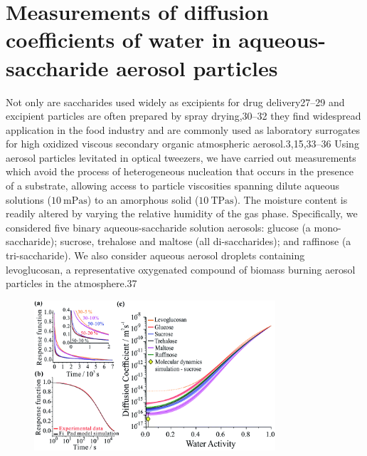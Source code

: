 \section{Measurements of diffusion coefficients of water in aqueous-saccharide aerosol particles}\label{sec:wat_d_coefs}

Not only are saccharides used widely as excipients for drug delivery27–29 and excipient particles are often prepared by spray drying,30–32 they find widespread application in the food industry and are commonly used as laboratory surrogates for high oxidized viscous secondary organic atmospheric aerosol.3,15,33–36 Using aerosol particles levitated in optical tweezers, we have carried out measurements which avoid the process of heterogeneous nucleation that occurs in the presence of a substrate, allowing access to particle viscosities spanning dilute aqueous solutions ($\SI{10}{\milli\pascal\second}$) to an amorphous solid ($\SI{10}{\tera\pascal\second}$). The moisture content is readily altered by varying the relative humidity of the gas phase. Specifically, we considered five binary aqueous-saccharide solution aerosols: glucose (a mono-saccharide); sucrose, trehalose and maltose (all di-saccharides); and raffinose (a tri-saccharide). We also consider aqueous aerosol droplets containing levoglucosan, a representative oxygenated compound of biomass burning aerosol particles in the atmosphere.37

\begin{figure}
    \centering
    \includegraphics[width=0.8\textwidth]{chapters/water_hopping/figures/f1.png}
    \label{fig:wat_workflow}
\end{figure}


